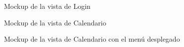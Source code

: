 \begin{figure}[H]
    \caption{Mockup de la vista de Login}
    \label{mockup-login}
\end{figure}

\begin{figure}[H]
    \caption{Mockup de la vista de Calendario}
    \label{mockup-calendario}
\end{figure}

\begin{figure}[H]
    \caption{Mockup de la vista de Calendario con el menú desplegado}
    \label{mockup-menu}
\end{figure}

